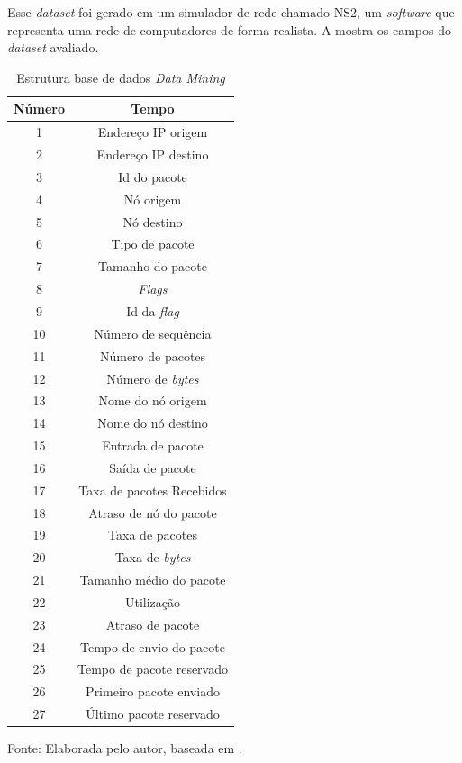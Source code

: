 Esse \textit{dataset} foi gerado em um simulador de rede chamado NS2, um \textit{software} que representa uma rede de computadores de forma realista. 
A  mostra os campos do \textit{dataset} avaliado. 

\begin{table}[!b]
	\centering
	\begin{threeparttable}
		\caption{Estrutura base de dados \textit{Data Mining}}
		\label{Tab:DataMining}
		\begin{tabular}{c c }
			\toprule
			\textbf{Número} & \textbf{Tempo}
			\\ \midrule
			1 &  Endereço IP origem  \\ \midrule
			2 &  Endereço IP destino  \\ \midrule
			3 &  Id do pacote  \\ \midrule
			4 &  Nó origem  \\ \midrule
			5 &  Nó destino  \\ \midrule
			6 &  Tipo de pacote  \\ \midrule
			7 &  Tamanho do pacote  \\ \midrule
			8 &  \textit{Flags}  \\ \midrule
			9 &   Id da \textit{flag}  \\ \midrule
			10 &  Número de sequência  \\ \midrule
			11 &  Número de pacotes  \\ \midrule
			12 &  Número de \textit{bytes}  \\ \midrule
			13 &  Nome do nó origem  \\ \midrule
			14 &  Nome do nó destino  \\ \midrule
			15 &  Entrada de pacote  \\ \midrule
			16 &  Saída de pacote  \\ \midrule
			17 &  Taxa de pacotes Recebidos \\ \midrule%
			18 &  Atraso de nó do pacote  \\ \midrule
			19 &  Taxa de pacotes\\ \midrule
			20 &  Taxa de \textit{bytes}  \\ \midrule
			21 &  Tamanho  médio do pacote  \\ \midrule
			22 &  Utilização  \\ \midrule
			23 &  Atraso de pacote  \\ \midrule
			24 &  Tempo de envio do pacote  \\ \midrule
			25 &  Tempo de pacote reservado  \\ \midrule
			26 &  Primeiro pacote enviado  \\ \midrule
			27 &  Último pacote reservado \\ \bottomrule
		\end{tabular}
		{Fonte: Elaborada pelo autor, baseada em \cite{DataMining}.}
	\end{threeparttable}
\end{table}

